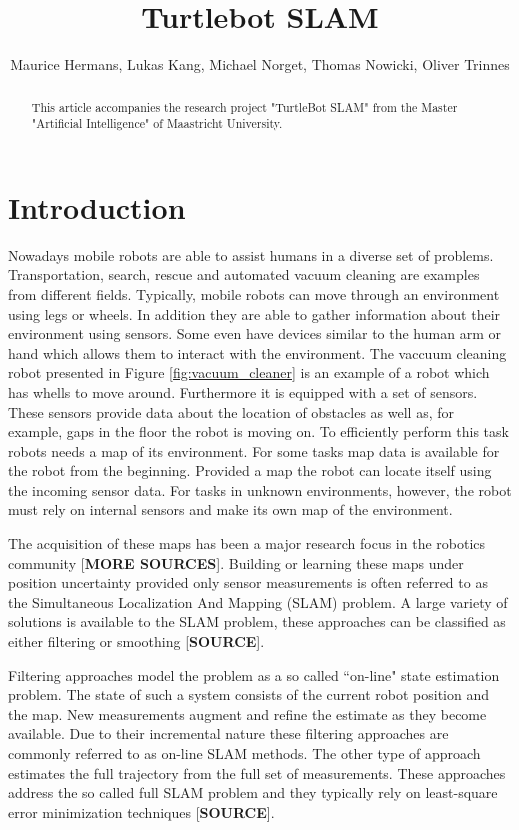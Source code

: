 \documentclass{ba-kecs}
\title{Turtlebot SLAM }
\author{Maurice Hermans, Lukas Kang, Michael Norget, Thomas Nowicki, Oliver Trinnes}
\begin{document}
\maketitle

\begin{abstract}
This article accompanies the research project "TurtleBot SLAM" from the Master "Artificial Intelligence" of Maastricht University.
\end{abstract}

\section{Introduction}
\label{sec:intro}
Nowadays mobile robots are able to assist humans in a diverse set of problems. Transportation, search, rescue and automated vacuum cleaning are examples from different fields. Typically, mobile robots can move through an environment using legs or wheels. In addition they are able to gather information about their environment using sensors. Some even have devices similar to the human arm or hand which allows them to interact with the environment. The vaccuum cleaning robot presented in Figure \ref{fig:vacuum_cleaner} is an example of a robot which has whells to move around. Furthermore it is equipped with a set of sensors. These sensors provide data about the location of obstacles as well as, for example, gaps in the floor the robot is moving on. To efficiently perform this task robots needs a map of its environment. For some tasks map data is available for the robot from the beginning. Provided a map the robot can locate itself using the incoming sensor data. For tasks in unknown environments, however, the robot must rely on internal sensors and make its own map of the environment.

The acquisition of these maps has been a major research focus in the robotics community \cite{Grisetti} [\textbf{MORE SOURCES}]. Building or learning these maps under position uncertainty provided only sensor measurements is often referred to as the Simultaneous Localization And Mapping (SLAM) problem. A large variety of solutions is available to the SLAM problem, these approaches can be classified as either filtering or smoothing [\textbf{SOURCE}].

Filtering approaches model the problem as a so called ``on-line" state estimation problem. The state of such a system consists of the current robot position and the map. New measurements augment and refine the estimate as they become available. Due to their incremental nature these filtering approaches are commonly referred to as on-line SLAM methods. The other type of approach estimates the full trajectory from the full set of measurements. These approaches address the so called full SLAM problem and they typically rely on least-square error minimization techniques [\textbf{SOURCE}].
\end{document}
